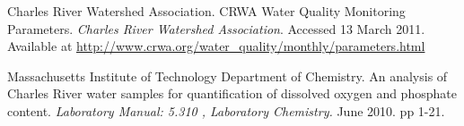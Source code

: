  

\begin{thebibliography}{99}


 Charles River Watershed Association.  CRWA Water Quality Monitoring Parameters. {\it Charles River Watershed Association}.  Accessed 13 March 2011. Available at \url{http://www.crwa.org/water_quality/monthly/parameters.html}

 Massachusetts Institute of Technology Department of Chemistry.  An analysis of Charles River water samples for quantification of dissolved oxygen and phosphate content.  {\it Laboratory Manual: 5.310 , Laboratory Chemistry.} June 2010. pp 1-21.


\end{thebibliography}
